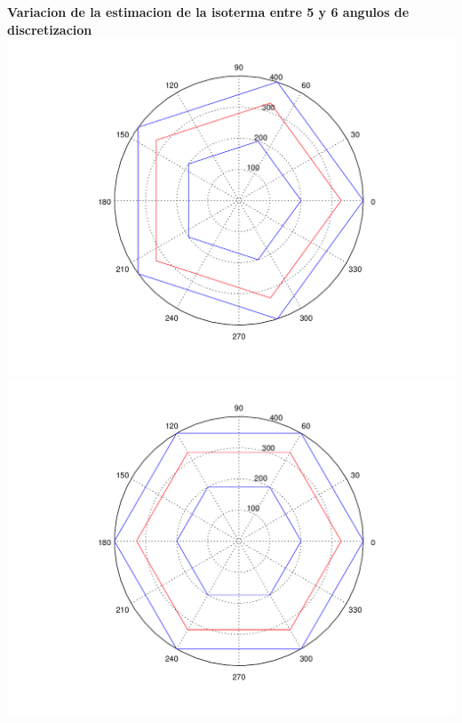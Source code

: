 \begin{enumerate}
	\vspace{0.5cm}
	  	\textbf{Variacion de la estimacion de la isoterma entre 5 y 6 angulos de discretizacion}\\
		\includegraphics[scale=0.35]{experimentos1a_1b/evolucion_posicion_isoterma_temperatura/variacion_angulos_radio_fijo_se_suaviza_isoterma/test10_050_radios_005_angulos_inst_001_isomap.png}
		\includegraphics[scale=0.35]{experimentos1a_1b/evolucion_posicion_isoterma_temperatura/variacion_angulos_radio_fijo_se_suaviza_isoterma/test10_050_radios_006_angulos_inst_001_isomap.png}


\end{enumerate}
